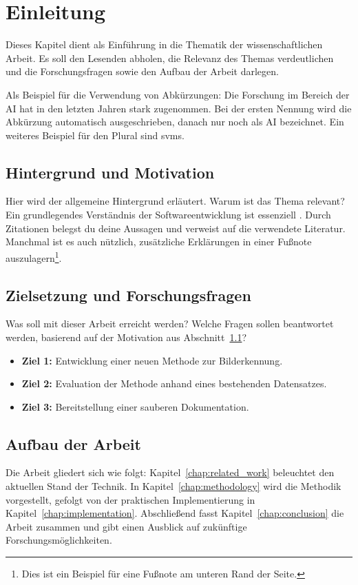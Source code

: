 \chapter{Einleitung}
\label{chap:introduction}

Dieses Kapitel dient als Einführung in die Thematik der wissenschaftlichen Arbeit. Es soll den Lesenden abholen, die Relevanz des Themas verdeutlichen und die Forschungsfragen sowie den Aufbau der Arbeit darlegen.

Als Beispiel für die Verwendung von Abkürzungen: Die Forschung im Bereich der \ac{AI} hat in den letzten Jahren stark zugenommen. Bei der ersten Nennung wird die Abkürzung automatisch ausgeschrieben, danach nur noch als \ac{AI} bezeichnet. Ein weiteres Beispiel für den Plural sind \acp{svm}.

\section{Hintergrund und Motivation}
\label{sec:motivation}
Hier wird der allgemeine Hintergrund erläutert. Warum ist das Thema relevant? 
Ein grundlegendes Verständnis der Softwareentwicklung ist essenziell \cite{meyer2020grundlagen}. Durch Zitationen belegst du deine Aussagen und verweist auf die verwendete Literatur. Manchmal ist es auch nützlich, zusätzliche Erklärungen in einer Fußnote auszulagern\footnote{Dies ist ein Beispiel für eine Fußnote am unteren Rand der Seite.}.

\section{Zielsetzung und Forschungsfragen}
Was soll mit dieser Arbeit erreicht werden? Welche Fragen sollen beantwortet werden, basierend auf der Motivation aus Abschnitt~\ref{sec:motivation}?
\begin{itemize}
  \item \textbf{Ziel 1:} Entwicklung einer neuen Methode zur Bilderkennung.
  \item \textbf{Ziel 2:} Evaluation der Methode anhand eines bestehenden Datensatzes.
  \item \textbf{Ziel 3:} Bereitstellung einer sauberen Dokumentation.
\end{itemize}

\section{Aufbau der Arbeit}
Die Arbeit gliedert sich wie folgt:
Kapitel~\ref{chap:related_work} beleuchtet den aktuellen Stand der Technik. In Kapitel~\ref{chap:methodology} wird die Methodik vorgestellt, gefolgt von der praktischen Implementierung in Kapitel~\ref{chap:implementation}. Abschließend fasst Kapitel~\ref{chap:conclusion} die Arbeit zusammen und gibt einen Ausblick auf zukünftige Forschungsmöglichkeiten.